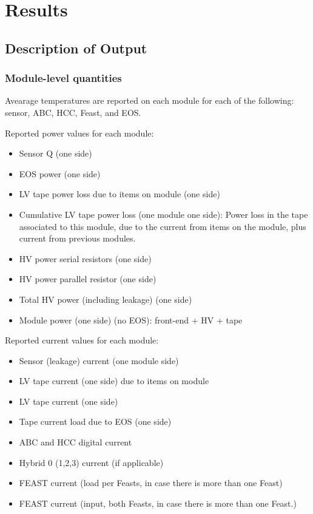 
\newcommand{\mry}[2]{
\multirow{#1}{*}{Year #2}
}

\section{Results}

\subsection{Description of Output}
\subsubsection{Module-level quantities}
Avearage temperatures are reported on each module for each of the following: sensor, ABC, HCC, Feast,
and EOS.

Reported power values for each module: 
\begin{itemize}
\setlength\itemsep{0.0em}
\item Sensor Q (one side)
\item EOS power (one side)
\item LV tape power loss due to items on module (one side)
\item Cumulative LV tape power loss (one module one side):
Power loss in the tape associated to this module, due to the current from items on the module, plus
current from previous modules.
\item HV power serial resistors (one side)
\item HV power parallel resistor (one side)
\item Total HV power (including leakage) (one side)
\item Module power (one side) (no EOS): front-end + HV + tape
\end{itemize}

Reported current values for each module:
\begin{itemize}
\setlength\itemsep{0.0em}
\item Sensor (leakage) current (one module side)
\item LV tape current (one side) due to items on module
\item LV tape current (one side)
\item Tape current load due to EOS (one side)
\item ABC and HCC digital current
\item Hybrid 0 (1,2,3) current (if applicable)
\item FEAST current (load per Feasts, in case there is more than one Feast)
\item FEAST current (input, both Feasts, in case there is more than one Feast.)
\end{itemize}

